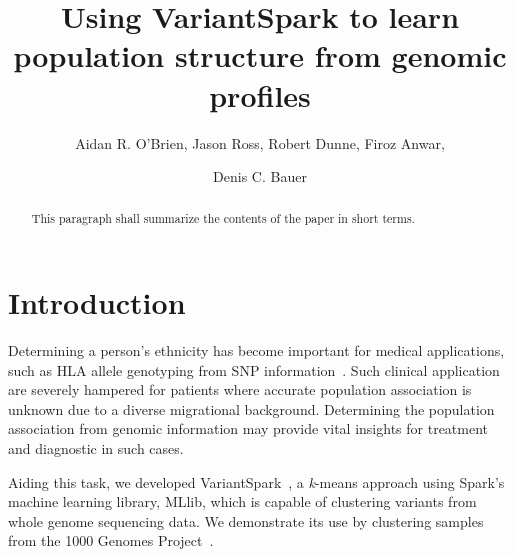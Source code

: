 \documentclass{llncs}
\newcommand{\variantSpark}{{\sc VariantSpark}}
\newcommand{\kMeans}{\textit{k}-means}
\begin{document}
\setcounter{save}{\value{section}}
{\def\addtocontents#1#2{}%
\def\addcontentsline#1#2#3{}%
\def\markboth#1#2{}%
%
\title{Using VariantSpark to learn population structure from genomic profiles}

\author{Aidan R. O'Brien, Jason Ross, Robert Dunne, Firoz Anwar, \and Denis C. Bauer}


\maketitle
%
\begin{abstract}
This paragraph shall summarize the contents of the paper
in short terms.
\end{abstract}
%
\section{Introduction}
%


Determining a person's ethnicity has become important for medical applications, such as HLA allele genotyping from SNP
information~\cite{Zheng2014}. Such clinical application are severely hampered for patients where accurate population
association is unknown due to a diverse migrational background. Determining the population association from genomic
information may provide vital insights for treatment and diagnostic in such cases.

Aiding this task, we developed \variantSpark~\cite{OBrien}, a \kMeans{} approach using {\sc Spark}'s machine learning library, {\sc MLlib}, which is capable of clustering variants from whole genome sequencing data. 
We demonstrate its use by clustering samples from the 1000 Genomes Project~\cite{1KG2012}.

}
\end{document}
